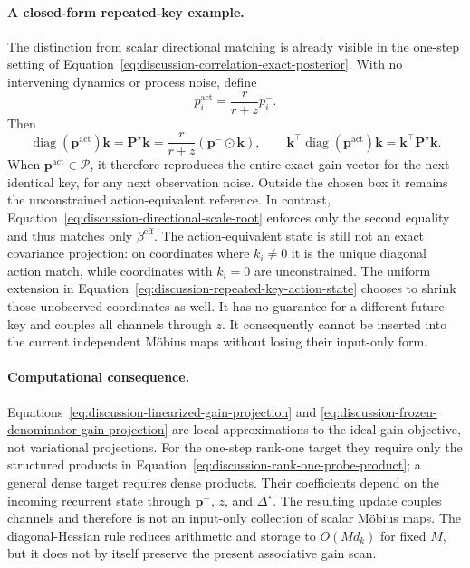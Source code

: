 \documentclass[11pt]{article}
\newcommand{\vct}[1]{\boldsymbol{#1}}
\newcommand{\diag}{\operatorname{diag}}
\begin{document}
\paragraph{A closed-form repeated-key example.}
The distinction from scalar directional matching is already visible in the one-step setting of
Equation~\eqref{eq:discussion-correlation-exact-posterior}. With no intervening dynamics or
process noise, define
\begin{equation}
  p_i^{\mathrm{act}}
  =\frac{r}{r+z}p_i^-.
  \label{eq:discussion-repeated-key-action-state}
\end{equation}
Then
\begin{equation}
  \diag(\vct{p}^{\mathrm{act}})\vct{k}
  =\vct{P}^\star\vct{k}
  =\frac{r}{r+z}(\vct{p}^{-}\odot\vct{k}),
  \qquad
  \vct{k}^\top\diag(\vct{p}^{\mathrm{act}})\vct{k}
  =\vct{k}^\top\vct{P}^\star\vct{k}.
  \label{eq:discussion-repeated-key-action-match}
\end{equation}
When $\vct{p}^{\mathrm{act}}\in\mathcal{P}$, it therefore reproduces the entire exact gain vector
for the next identical key, for any next observation noise. Outside the chosen box it remains the
unconstrained action-equivalent reference. In contrast,
Equation~\eqref{eq:discussion-directional-scale-root} enforces only the second equality and thus
matches only $\beta^{\mathrm{eff}}$. The action-equivalent state is still not an exact covariance
projection: on coordinates where $k_i\neq0$ it is the unique diagonal action match, while
coordinates with $k_i=0$ are unconstrained. The uniform extension in
Equation~\eqref{eq:discussion-repeated-key-action-state} chooses to shrink those unobserved
coordinates as well. It has no guarantee for a different future key and couples all channels
through $z$. It consequently cannot be inserted into the
current independent M\"obius maps without losing their input-only form.

\paragraph{Computational consequence.}
Equations~\eqref{eq:discussion-linearized-gain-projection} and
\eqref{eq:discussion-frozen-denominator-gain-projection} are local approximations to the ideal
gain objective, not variational projections. For the one-step rank-one target they require only
the structured products in Equation~\eqref{eq:discussion-rank-one-probe-product}; a general dense
target requires dense products. Their coefficients depend on the incoming recurrent state through
$\vct{p}^{-}$, $z$, and $\Delta^\star$. The resulting update couples channels and therefore is not an
input-only collection of scalar M\"obius maps. The diagonal-Hessian rule reduces arithmetic and
storage to $O(Md_k)$ for fixed $M$, but it does not by itself preserve the present associative gain
scan.
\end{document}

